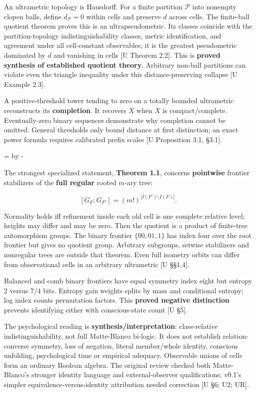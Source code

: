 \documentclass[10pt,letterpaper]{article}
\newcommand{\NeedDisplaySpace}{\par\begingroup\dimen0=\pagegoal\advance\dimen0 by -\pagetotal\ifdim\dimen0<8\baselineskip\newpage\fi\endgroup}
\begin{document}
An ultrametric topology is Hausdorff. For a finite partition \(\mathcal P\) into nonempty clopen balls, define \(d_\mathcal P=0\) within cells and preserve \(d\) across cells. The finite-ball quotient theorem proves this is an ultrapseudometric. Its classes coincide with the partition-topology indistinguishability classes, metric identification, and agreement under all cell-constant observables; it is the greatest pseudometric dominated by \(d\) and vanishing in cells [U Theorem 2.2]. This is \textbf{proved synthesis of established quotient theory}. Arbitrary non-ball partitions can violate even the triangle inequality under this distance-preserving collapse [U Example 2.3].\par

A positive-threshold tower tending to zero on a totally bounded ultrametric reconstructs its \textbf{completion}. It recovers \(X\) when \(X\) is compact/complete. Eventually-zero binary sequences demonstrate why completion cannot be omitted. General thresholds only bound distance at first distinction; an exact power formula requires calibrated prefix scales [U Proposition 3.1, \S{}3.1].\par

\NeedDisplaySpace
\begin{samepage}
The strongest specialized statement, \textbf{Theorem 1.1}, concerns \textbf{pointwise} frontier stabilizers of the \textbf{full regular} rooted \(m\)-ary tree:\par
\[
[G_F:G_{F'}]=(m!)^{|I(F')\setminus I(F)|}.
\]
\end{samepage}
Normality holds iff refinement inside each old cell is one complete relative level; heights may differ and may be zero. Then the quotient is a product of finite-tree automorphism groups. The binary frontier \(\{00,01,1\}\) has index four over the root frontier but gives no quotient group. Arbitrary subgroups, setwise stabilizers and nonregular trees are outside that theorem. Even full isometry orbits can differ from observational cells in an arbitrary ultrametric [U \S{}\S{}1,4].\par

Balanced and comb binary frontiers have equal symmetry index eight but entropy 2 versus \(7/4\) bits. Entropy gain weights splits by mass and conditional entropy; log index counts permutation factors. This \textbf{proved negative distinction} prevents identifying either with conscious-state count [U \S{}5].\par

The psychological reading is \textbf{synthesis/interpretation}: class-relative indistinguishability, not full Matte-Blanco bi-logic. It does not establish relation-converse symmetry, loss of negation, literal member/whole identity, conscious unfolding, psychological time or empirical adequacy. Observable unions of cells form an ordinary Boolean algebra. The original review checked both Matte-Blanco's stronger identity language and external-observer qualifications; v0.1's simpler equivalence-versus-identity attribution needed correction [U \S{}6; U2; UR].\par
\end{document}
